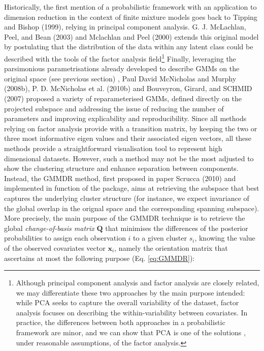 Historically, the first mention of a probabilistic framework with an application to dimension reduction in the context of finite mixture models goes back to Tipping and Bishop (1999), relying in principal component analysis. G. J. McLachlan, Peel, and Bean (2003) and Mclachlan and Peel (2000) extends this original model by postulating that the distribution of the data within any latent class could be described with the tools of the factor analysis field\footnote{Although principal component analysis and factor analysis are closely related, we may differentiate these two approaches by the main purpose intended: while PCA seeks to capture the overall variability of the dataset, factor analysis focuses on describing the within-variability between covariates. In practice, the differences between both approaches in a probabilistic framework are minor, and we can show that PCA is one of the solutions , under reasonable assumptions, of the factor analysis.} Finally, leveraging the parsimonious parametrisations already developed to describe GMMs on the original space (see previous section) , Paul David McNicholas and Murphy (2008b), P. D. McNicholas et al. (2010b) and Bouveyron, Girard, and SCHMID (2007) proposed a variety of reparameterised GMMs, defined directly on the projected subspace and addressing the issue of reducing the number of parameters and improving explicability and reproducibility. Since all methods relying on factor analysis provide with a transition matrix, by keeping the two or three most informative eigen values and their associated eigen vectors, all these methods provide a straightforward visualisation tool to represent high dimensional datasets.
However, such a method may not be the most adjusted to show the clustering structure and enhance separation between components. Instead, the GMMDR method, first proposed in paper Scrucca (2010) and implemented in function  of the  package, aims at retrieving the subspace that best captures the underlying cluster structure (for instance, we expect invariance of the global overlap in the orignal space and the corresponding spanning subspace). More precisely, the main purpose of the GMMDR technique is to retrieve the global \emph{change-of-basis matrix} \(\boldsymbol{Q}\) that minimises the differences of the posterior probabilities to assign each observation \(i\) to a given cluster \(s_i\), knowing the value of the observed covariates vector \(\boldsymbol{x}_i\), namely the orientation matrix that ascertains at most the following purpose (Eq. \eqref{eq:GMMDR}):

